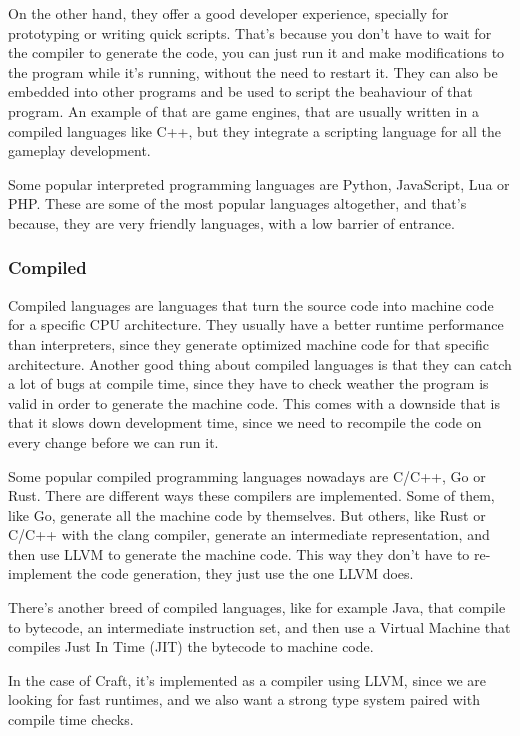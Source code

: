 ﻿\documentclass[10pt,a4paper,twocolumn,twoside]{article}
\begin{document}
On the other hand, they offer a good developer experience, specially for
prototyping or writing quick scripts. That's because you don't have to wait for
the compiler to generate the code, you can just run it and make modifications to
the program while it's running, without the need to restart it. They can also be
embedded into other programs and be used to script the beahaviour of that
program. An example of that are game engines, that are usually written in a
compiled languages like C++, but they integrate a scripting language for all the
gameplay development.

Some popular interpreted programming languages are Python, JavaScript, Lua or
PHP. These are some of the most popular languages altogether, and that's
because, they are very friendly languages, with a low barrier of entrance.

\subsubsection{Compiled}
Compiled languages are languages that turn the source code into machine code for
a specific CPU architecture. They usually have a better runtime performance than
interpreters, since they generate optimized machine code for that specific
architecture. Another good thing about compiled languages is that they can catch
a lot of bugs at compile time, since they have to check weather the program is
valid in order to generate the machine code. This comes with a downside that is
that it slows down development time, since we need to recompile the code on
every change before we can run it.

Some popular compiled programming languages nowadays are C/C++, Go or Rust.
There are different ways these compilers are implemented. Some of them, like Go,
generate all the machine code by themselves. But others, like Rust or C/C++ with
the clang compiler, generate an intermediate representation, and then use LLVM
to generate the machine code. This way they don't have to re-implement the code
generation, they just use the one LLVM does.

There's another breed of compiled languages, like for example Java, that
compile to bytecode, an intermediate instruction set, and then use a Virtual 
Machine that compiles Just In Time (JIT) the bytecode to machine code.

In the case of Craft, it's implemented as a compiler using LLVM, since we are
looking for fast runtimes, and we also want a strong type system paired with
compile time checks.
\end{document}
